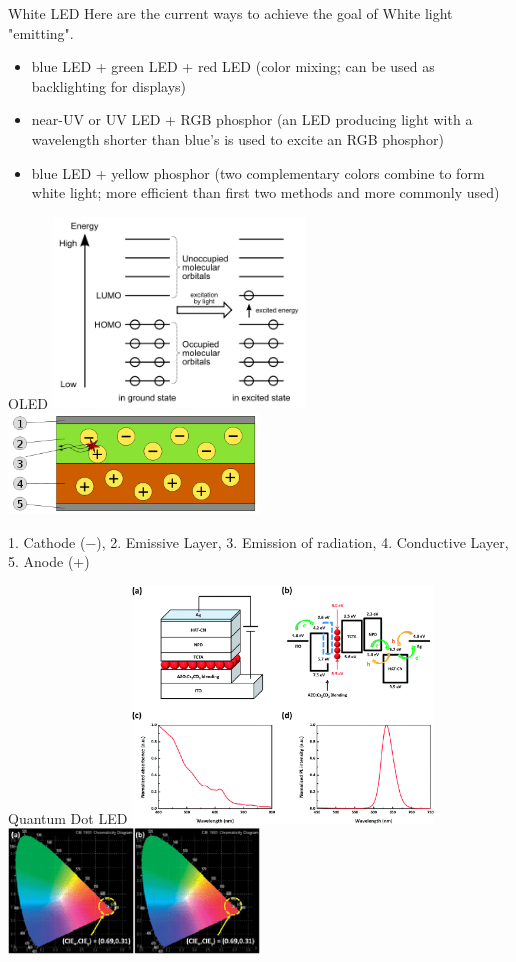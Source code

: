 \documentclass[english]{beamer}
\begin{document}
\begin{frame}{White LED}
	Here are the current ways to achieve the goal of White light "emitting".
	\begin{itemize}
		\item blue LED + green LED + red LED (color mixing; can be used as backlighting for displays)
		\item near-UV or UV LED + RGB phosphor (an LED producing light with a wavelength shorter than blue's is used to excite an RGB phosphor)
		\item blue LED + yellow phosphor (two complementary colors combine to form white light; more efficient than first two methods and more commonly used)
	\end{itemize}
\end{frame}
\begin{frame}{OLED}
	\includegraphics[width=0.5\textwidth]{homo}
	\includegraphics[width=0.5\textwidth]{oled}
	
	1. Cathode (−), 2. Emissive Layer, 3. Emission of radiation, 4. Conductive Layer, 5. Anode (+)
\end{frame}
\begin{frame}{Quantum Dot LED}
	\includegraphics[width=0.6\textwidth]{qlede}
	\includegraphics[width=0.5\textwidth]{qled2e}
\end{frame}
\end{document}
